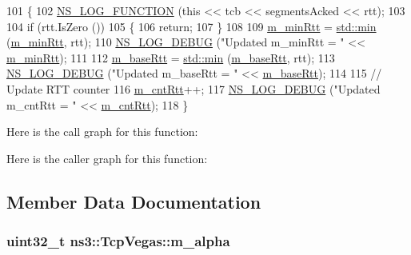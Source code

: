 \begin{DoxyCode}
101 \{
102   \hyperlink{log-macros-disabled_8h_a90b90d5bad1f39cb1b64923ea94c0761}{NS\_LOG\_FUNCTION} (\textcolor{keyword}{this} << tcb << segmentsAcked << rtt);
103 
104   \textcolor{keywordflow}{if} (rtt.IsZero ())
105     \{
106       \textcolor{keywordflow}{return};
107     \}
108 
109   \hyperlink{classns3_1_1TcpVegas_aba6a10d787820b6907313b79cc16582c}{m\_minRtt} = \hyperlink{80211b_8c_ac6afabdc09a49a433ee19d8a9486056d}{std::min} (\hyperlink{classns3_1_1TcpVegas_aba6a10d787820b6907313b79cc16582c}{m\_minRtt}, rtt);
110   \hyperlink{group__logging_ga413f1886406d49f59a6a0a89b77b4d0a}{NS\_LOG\_DEBUG} (\textcolor{stringliteral}{"Updated m\_minRtt = "} << \hyperlink{classns3_1_1TcpVegas_aba6a10d787820b6907313b79cc16582c}{m\_minRtt});
111 
112   \hyperlink{classns3_1_1TcpVegas_ae283bcc32d2d92002477abafd1ca5132}{m\_baseRtt} = \hyperlink{80211b_8c_ac6afabdc09a49a433ee19d8a9486056d}{std::min} (\hyperlink{classns3_1_1TcpVegas_ae283bcc32d2d92002477abafd1ca5132}{m\_baseRtt}, rtt);
113   \hyperlink{group__logging_ga413f1886406d49f59a6a0a89b77b4d0a}{NS\_LOG\_DEBUG} (\textcolor{stringliteral}{"Updated m\_baseRtt = "} << \hyperlink{classns3_1_1TcpVegas_ae283bcc32d2d92002477abafd1ca5132}{m\_baseRtt});
114 
115   \textcolor{comment}{// Update RTT counter}
116   \hyperlink{classns3_1_1TcpVegas_a4149c239657ba2ea7399374ec0fd9682}{m\_cntRtt}++;
117   \hyperlink{group__logging_ga413f1886406d49f59a6a0a89b77b4d0a}{NS\_LOG\_DEBUG} (\textcolor{stringliteral}{"Updated m\_cntRtt = "} << \hyperlink{classns3_1_1TcpVegas_a4149c239657ba2ea7399374ec0fd9682}{m\_cntRtt});
118 \}
\end{DoxyCode}


Here is the call graph for this function\+:




Here is the caller graph for this function\+:




\subsection{Member Data Documentation}
\subsubsection[{\texorpdfstring{m\+\_\+alpha}{m_alpha}}]{\setlength{\rightskip}{0pt plus 5cm}uint32\+\_\+t ns3\+::\+Tcp\+Vegas\+::m\+\_\+alpha\hspace{0.3cm}{\ttfamily [private]}}\hypertarget{classns3_1_1TcpVegas_a50cf33c05a6dd0e6a8da11e741291de8}{}\label{classns3_1_1TcpVegas_a50cf33c05a6dd0e6a8da11e741291de8}


